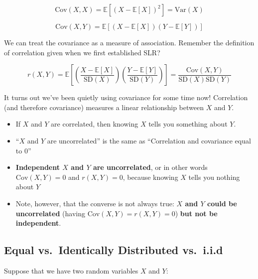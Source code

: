 \documentclass[
  letterpaper,
  DIV=11,
  numbers=noendperiod]{scrreprt}
\providecommand{\tightlist}{%
  \setlength{\itemsep}{0pt}\setlength{\parskip}{0pt}}\usepackage{longtable,booktabs,array}
\begin{document}
\[\text{Cov}(X, X) = \mathbb{E}[(X - \mathbb{E}[X])^2] = \text{Var}(X)\]

\[\text{Cov}(X, Y) = \mathbb{E}[(X - \mathbb{E}[X])(Y - \mathbb{E}[Y])]\]

We can treat the covariance as a measure of association. Remember the
definition of correlation given when we first established SLR?

\[r(X, Y) = \mathbb{E}\left[\left(\frac{X-\mathbb{E}[X]}{\text{SD}(X)}\right)\left(\frac{Y-\mathbb{E}[Y]}{\text{SD}(Y)}\right)\right] = \frac{\text{Cov}(X, Y)}{\text{SD}(X)\text{SD}(Y)}\]

It turns out we've been quietly using covariance for some time now!
Correlation (and therefore covariance) measures a linear relationship
between \(X\) and \(Y\).

\begin{itemize}
\tightlist
\item
  If \(X\) and \(Y\) are correlated, then knowing \(X\) tells you
  something about \(Y\).
\item
  ``\(X\) and \(Y\) are uncorrelated'' is the same as ``Correlation and
  covariance equal to 0''
\item
  \textbf{Independent \(X\) and \(Y\) are uncorrelated}, or in other
  words \(\text{Cov}(X, Y) =0\) and \(r(X, Y) = 0\), because knowing
  \(X\) tells you nothing about \(Y\)
\item
  Note, however, that the converse is not always true: \textbf{\(X\) and
  \(Y\) could be uncorrelated} (having
  \(\text{Cov}(X, Y) = r(X, Y) = 0\)) \textbf{but not be independent}.
\end{itemize}

\subsection{Equal vs.~Identically Distributed
vs.~i.i.d}\label{equal-vs.-identically-distributed-vs.-i.i.d}

Suppose that we have two random variables \(X\) and \(Y\):
\end{document}
